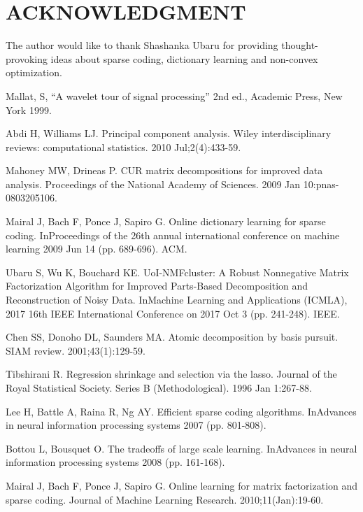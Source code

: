 \documentclass[conference]{IEEEtran}
\begin{document}
\section{ACKNOWLEDGMENT}

The author would like to thank Shashanka Ubaru for providing thought-provoking ideas about sparse coding, dictionary learning and non-convex optimization.

\begin{thebibliography}{00}

 Mallat, S, ``A wavelet tour of signal processing'' 2nd ed., Academic Press, New York 1999.

 Abdi H, Williams LJ. Principal component analysis. Wiley interdisciplinary reviews: computational statistics. 2010 Jul;2(4):433-59.

 Mahoney MW, Drineas P. CUR matrix decompositions for improved data analysis. Proceedings of the National Academy of Sciences. 2009 Jan 10:pnas-0803205106.

 Mairal J, Bach F, Ponce J, Sapiro G. Online dictionary learning for sparse coding. InProceedings of the 26th annual international conference on machine learning 2009 Jun 14 (pp. 689-696). ACM.


 Ubaru S, Wu K, Bouchard KE. UoI-NMFcluster: A Robust Nonnegative Matrix Factorization Algorithm for Improved Parts-Based Decomposition and Reconstruction of Noisy Data. InMachine Learning and Applications (ICMLA), 2017 16th IEEE International Conference on 2017 Oct 3 (pp. 241-248). IEEE.

 Chen SS, Donoho DL, Saunders MA. Atomic decomposition by basis pursuit. SIAM review. 2001;43(1):129-59.

 Tibshirani R. Regression shrinkage and selection via the lasso. Journal of the Royal Statistical Society. Series B (Methodological). 1996 Jan 1:267-88.

 Lee H, Battle A, Raina R, Ng AY. Efficient sparse coding algorithms. InAdvances in neural information processing systems 2007 (pp. 801-808).

 Bottou L, Bousquet O. The tradeoffs of large scale learning. InAdvances in neural information processing systems 2008 (pp. 161-168).

 Mairal J, Bach F, Ponce J, Sapiro G. Online learning for matrix factorization and sparse coding. Journal of Machine Learning Research. 2010;11(Jan):19-60.


\end{thebibliography}
\end{document}
